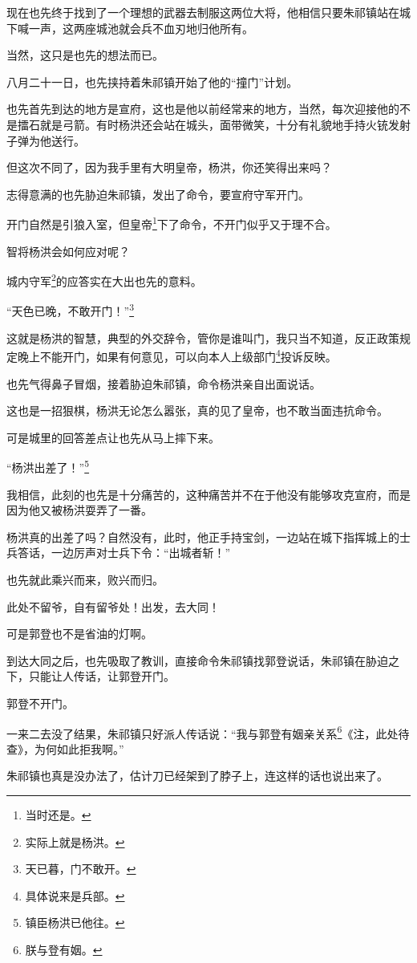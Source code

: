 \begin{multicols}{\theparacolNo}
现在也先终于找到了一个理想的武器去制服这两位大将，他相信只要朱祁镇站在城下喊一声，这两座城池就会兵不血刃地归他所有。

当然，这只是也先的想法而已。

八月二十一日，也先挟持着朱祁镇开始了他的“撞门”计划。

也先首先到达的地方是宣府，这也是他以前经常来的地方，当然，每次迎接他的不是擂石就是弓箭。有时杨洪还会站在城头，面带微笑，十分有礼貌地手持火铳发射子弹为他送行。

但这次不同了，因为我手里有大明皇帝，杨洪，你还笑得出来吗？

志得意满的也先胁迫朱祁镇，发出了命令，要宣府守军开门。

开门自然是引狼入室，但皇帝\footnote{当时还是。}下了命令，不开门似乎又于理不合。

智将杨洪会如何应对呢？

城内守军\footnote{实际上就是杨洪。}的应答实在大出也先的意料。

“天色已晚，不敢开门！”\footnote{天已暮，门不敢开。}

这就是杨洪的智慧，典型的外交辞令，管你是谁叫门，我只当不知道，反正政策规定晚上不能开门，如果有何意见，可以向本人上级部门\footnote{具体说来是兵部。}投诉反映。

也先气得鼻子冒烟，接着胁迫朱祁镇，命令杨洪亲自出面说话。

这也是一招狠棋，杨洪无论怎么嚣张，真的见了皇帝，也不敢当面违抗命令。

可是城里的回答差点让也先从马上摔下来。

“杨洪出差了！”\footnote{镇臣杨洪已他往。}

我相信，此刻的也先是十分痛苦的，这种痛苦并不在于他没有能够攻克宣府，而是因为他又被杨洪耍弄了一番。

杨洪真的出差了吗？自然没有，此时，他正手持宝剑，一边站在城下指挥城上的士兵答话，一边厉声对士兵下令：“出城者斩！”

也先就此乘兴而来，败兴而归。

此处不留爷，自有留爷处！出发，去大同！

可是郭登也不是省油的灯啊。

到达大同之后，也先吸取了教训，直接命令朱祁镇找郭登说话，朱祁镇在胁迫之下，只能让人传话，让郭登开门。

郭登不开门。

一来二去没了结果，朱祁镇只好派人传话说：“我与郭登有姻亲关系\footnote{朕与登有姻。}《注，此处待查》，为何如此拒我啊。”

朱祁镇也真是没办法了，估计刀已经架到了脖子上，连这样的话也说出来了。


\end{multicols}

